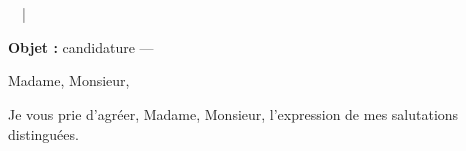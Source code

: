 \documentclass[11pt,a4paper]{article}
\begin{document}
\textbf{}\\
\\
\ \ |\ \ 

\hfill {}

\textbf{Objet :} candidature — 

Madame, Monsieur,


Je vous prie d'agréer, Madame, Monsieur, l'expression de mes salutations distinguées.

\end{document}
